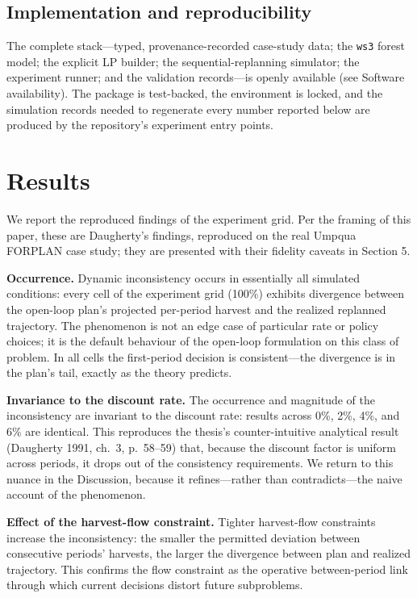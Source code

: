 \documentclass[12pt]{article}
\begin{document}
\hypertarget{implementation-and-reproducibility}{%
\subsection{Implementation and reproducibility}\label{implementation-and-reproducibility}}

The complete stack---typed, provenance-recorded case-study data; the \texttt{ws3} forest model; the explicit LP builder; the sequential-replanning simulator; the experiment runner; and the validation records---is openly available (see Software availability). The package is test-backed, the environment is locked, and the simulation records needed to regenerate every number reported below are produced by the repository's experiment entry points.

\hypertarget{results}{%
\section{Results}\label{results}}

We report the reproduced findings of the experiment grid. Per the framing of this paper, these are Daugherty's findings, reproduced on the real Umpqua FORPLAN case study; they are presented with their fidelity caveats in Section 5.

\textbf{Occurrence.} Dynamic inconsistency occurs in essentially all simulated conditions: every cell of the experiment grid (100\%) exhibits divergence between the open-loop plan's projected per-period harvest and the realized replanned trajectory. The phenomenon is not an edge case of particular rate or policy choices; it is the default behaviour of the open-loop formulation on this class of problem. In all cells the first-period decision is consistent---the divergence is in the plan's tail, exactly as the theory predicts.

\textbf{Invariance to the discount rate.} The occurrence and magnitude of the inconsistency are invariant to the discount rate: results across 0\%, 2\%, 4\%, and 6\% are identical. This reproduces the thesis's counter-intuitive analytical result (Daugherty 1991, ch.~3, p.~58--59) that, because the discount factor is uniform across periods, it drops out of the consistency requirements. We return to this nuance in the Discussion, because it refines---rather than contradicts---the naive account of the phenomenon.

\textbf{Effect of the harvest-flow constraint.} Tighter harvest-flow constraints increase the inconsistency: the smaller the permitted deviation between consecutive periods' harvests, the larger the divergence between plan and realized trajectory. This confirms the flow constraint as the operative between-period link through which current decisions distort future subproblems.
\end{document}
